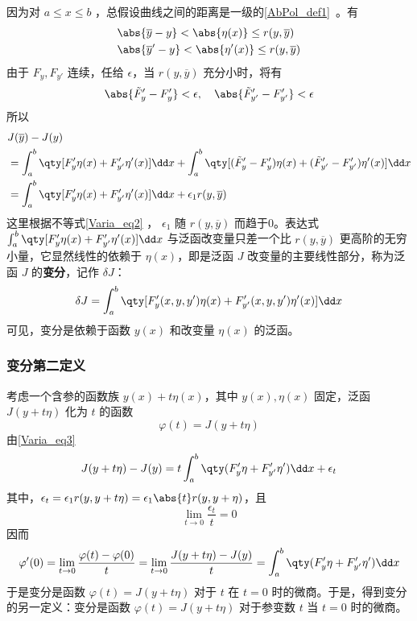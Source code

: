 因为对 $a\leq x\leq b$ ，总假设曲线之间的距离是一级的\autoref{AbPol_def1}~。有
\begin{equation}
\begin{aligned}
&\abs{\overline{y}-y}<\abs{\eta(x)}\leq r(y,\overline{y})\\
&\abs{\overline{y}'-y}<\abs{\eta'(x)}\leq r(y,\overline{y})
\end{aligned}
\end{equation}
由于 $F_y,F_{y'}$ 连续，任给 $\epsilon$，当 $r(y,\overline{y})$ 充分小时，将有
\begin{equation}\label{Varia_eq2}
\abs{\tilde{F}'_y-F'_y}<\epsilon,\quad\abs{\tilde{F}'_{y'}-F'_{y'}}<\epsilon
\end{equation}
所以
\begin{equation}\label{Varia_eq3}
\begin{aligned}
&J(\overline{y})-J(y)\\
&=\int_a^b\qty[F'_y\eta(x)+F'_{y'}\eta'(x)]\dd x+\int_a^b\qty[(\tilde{F}'_y-F'_y)\eta(x)+(\tilde{F}'_{y'}-F'_{y'})\eta'(x)]\dd x\\
&=\int_a^b\qty[F'_y\eta(x)+F'_{y'}\eta'(x)]\dd x+\epsilon_1r(y,\overline{y})
\end{aligned}
\end{equation}
这里根据不等式\autoref{Varia_eq2} ， $\epsilon_1$ 随 $r(y,\overline{y})$ 而趋于0。表达式 $\int_a^b\qty[F'_y\eta(x)+F'_{y'}\eta'(x)]\dd x$ 与泛函改变量只差一个比 $r(y,\overline{y})$ 更高阶的无穷小量，它显然线性的依赖于 $\eta(x)$，即是泛函 $J$ 改变量的主要线性部分，称为泛函 $J$ 的\textbf{变分}，记作 $\delta{J}$：
\begin{equation}\label{Varia_eq4}
\delta J=\int_a^b\qty[F'_y(x,y,y')\eta(x)+F'_{y'}(x,y,y')\eta'(x)]\dd x
\end{equation}
可见，变分是依赖于函数 $y(x)$ 和改变量 $\eta(x)$ 的泛函。
\subsubsection{变分第二定义}
考虑一个含参的函数族 $y(x)+t\eta(x)$，其中 $y(x),\eta(x)$ 固定，泛函 $J(y+t\eta)$ 化为 $t$ 的函数
\begin{equation}
\varphi(t)=J(y+t\eta)
\end{equation}
由\autoref{Varia_eq3} 
\begin{equation}
J(y+t\eta)-J(y)=t\int_a^b\qty(F'_y\eta+F'_{y'}\eta')\dd x+\epsilon_t
\end{equation}
其中，$\epsilon_t=\epsilon_1r(y,y+t\eta)=\epsilon_1\abs{t}r(y,y+\eta)$，且
\begin{equation}
\lim_{t\rightarrow 0}\frac{\epsilon_t}{t}=0
\end{equation}
因而
\begin{equation}
\varphi'(0)=\lim_{t\rightarrow 0}\frac{\varphi(t)-\varphi(0)}{t}=\lim_{t\rightarrow 0}\frac{J(y+t\eta)-J(y)}{t}=\int_a^b\qty(F'_y\eta+F'_{y'}\eta')\dd x
\end{equation}
于是变分是函数 $\varphi(t)=J(y+t\eta)$ 对于 $t$ 在 $t=0$ 时的微商。于是，得到变分的另一定义：变分是函数 $\varphi(t)=J(y+t\eta)$ 对于参变数 $t$ 当 $t=0$ 时的微商。
